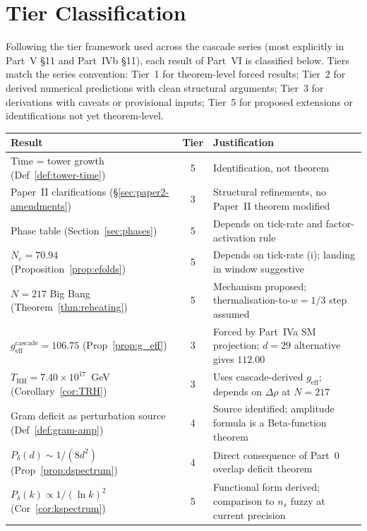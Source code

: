 \documentclass[12pt,a4paper]{article}
\begin{document}
\section{Tier Classification}
\label{sec:tiers}

Following the tier framework used across the cascade series (most explicitly
in Part~V \S11 and Part~IVb \S11), each result of Part~VI is classified below.
Tiers match the series convention: Tier~1 for theorem-level forced results;
Tier~2 for derived numerical predictions with clean structural arguments; Tier~3
for derivations with caveats or provisional inputs; Tier~5 for proposed
extensions or identifications not yet theorem-level.

\begin{center}
\renewcommand{\arraystretch}{1.3}
\begin{tabular}{@{}>{\raggedright}p{6.5cm} c >{\raggedright\arraybackslash}p{6cm}@{}}
\toprule
Result & Tier & Justification \\
\midrule
Time = tower growth (Def~\ref{def:tower-time}) & 5 &
  Identification, not theorem \\
Paper~II clarifications (\S\ref{sec:paper2-amendments}) & 3 &
  Structural refinements, no Paper~II theorem modified \\
Phase table (Section~\ref{sec:phases}) & 5 &
  Depends on tick-rate and factor-activation rule \\
$N_e = 70.94$ (Proposition~\ref{prop:efolds}) & 5 &
  Depends on tick-rate (i); landing in window suggestive \\
$N = 217$ Big Bang (Theorem~\ref{thm:reheating}) & 5 &
  Mechanism proposed; thermalisation-to-$w=1/3$ step assumed \\
$g_{\mathrm{eff}}^{\mathrm{cascade}} = 106.75$ (Prop~\ref{prop:g_eff}) & 3 &
  Forced by Part~IVa SM projection; $d=29$ alternative gives $112.00$ \\
$T_{\mathrm{RH}} = 7.40 \times 10^{17}$~GeV (Corollary~\ref{cor:TRH}) & 3 &
  Uses cascade-derived $g_{\mathrm{eff}}$; depends on $\Delta\rho$ at $N{=}217$ \\
Gram deficit as perturbation source (Def~\ref{def:gram-amp}) & 4 &
  Source identified; amplitude formula is a Beta-function theorem \\
$P_\delta(d) \sim 1/(8d^2)$ (Prop~\ref{prop:dspectrum}) & 4 &
  Direct consequence of Part~0 overlap deficit theorem \\
$P_\delta(k) \propto 1/(\ln k)^2$ (Cor~\ref{cor:kspectrum}) & 5 &
  Functional form derived; comparison to $n_s$ fuzzy at current precision \\

\end{tabular}
\end{center}
\end{document}
